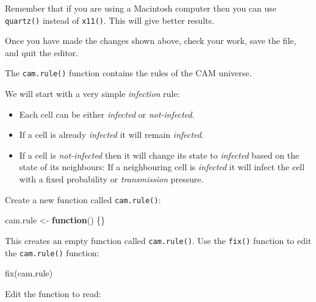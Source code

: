 \documentclass[
  12pt,
  a4paper]{book}
\newenvironment{Shaded}{\begin{snugshade}}{\end{snugshade}}
\newcommand{\ControlFlowTok}[1]{\textcolor[rgb]{0.13,0.29,0.53}{\textbf{#1}}}
\newcommand{\DecValTok}[1]{\textcolor[rgb]{0.00,0.00,0.81}{#1}}
\newcommand{\FunctionTok}[1]{\textcolor[rgb]{0.00,0.00,0.00}{#1}}
\newcommand{\NormalTok}[1]{#1}
\newcommand{\OtherTok}[1]{\textcolor[rgb]{0.56,0.35,0.01}{#1}}
\newcommand{\SpecialCharTok}[1]{\textcolor[rgb]{0.00,0.00,0.00}{#1}}
\begin{document}
Remember that if you are using a Macintosh computer then you can use \texttt{quartz()} instead of \texttt{x11()}. This will give better results.

Once you have made the changes shown above, check your work, save the file, and quit the editor.

The \texttt{cam.rule()} function contains the rules of the CAM universe.

We will start with a very simple \emph{infection} rule:

\begin{itemize}
\item
  Each cell can be either \emph{infected} or \emph{not-infected}.
\item
  If a cell is already \emph{infected} it will remain \emph{infected}.
\item
  If a cell is \emph{not-infected} then it will change its state to \emph{infected} based on the state of its neighbours: If a neighbouring cell is \emph{infected} it will infect the cell with a fixed probability or \emph{transmission} pressure.
\end{itemize}

Create a new function called \texttt{cam.rule()}:

\begin{Shaded}
\begin{Highlighting}[]
\NormalTok{cam.rule }\OtherTok{\textless{}{-}} \ControlFlowTok{function}\NormalTok{() \{\}}
\end{Highlighting}
\end{Shaded}

This creates an empty function called \texttt{cam.rule()}. Use the \texttt{fix()} function to edit the \texttt{cam.rule()} function:

\begin{Shaded}
\begin{Highlighting}[]
\FunctionTok{fix}\NormalTok{(cam.rule)}
\end{Highlighting}
\end{Shaded}

Edit the function to read:

\begin{Shaded}
\end{Shaded}
\end{document}

